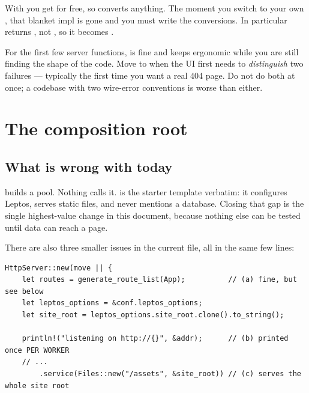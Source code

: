 \begin{pitfall}
With  you get  for free, so  converts anything. The moment you switch to your own
, that blanket impl is gone and you must write the conversions. In particular
 returns , not , so it
becomes .
\end{pitfall}

\begin{pattern}
For the first few server functions,  is fine and keeps 
ergonomic while you are still finding the shape of the code. Move to  when the UI
first needs to \emph{distinguish} two failures --- typically the first time you want a real 404
page. Do not do both at once; a codebase with two wire-error conventions is worse than either.
\end{pattern}

\chapter{The composition root}
\label{ch:composition}

\section{What is wrong with  today}

 builds a pool. Nothing calls it.  is the
starter template verbatim: it configures Leptos, serves static files, and never mentions a
database. Closing that gap is the single highest-value change in this document, because nothing
else can be tested until data can reach a page.

There are also three smaller issues in the current file, all in the same few lines:

\begin{lstlisting}[style=rs,caption={\file{src/main.rs}, lines 15--21 --- three problems in seven lines.}]
HttpServer::new(move || {
    let routes = generate_route_list(App);          // (a) fine, but see below
    let leptos_options = &conf.leptos_options;
    let site_root = leptos_options.site_root.clone().to_string();

    println!("listening on http://{}", &addr);      // (b) printed once PER WORKER
    // ...
        .service(Files::new("/assets", &site_root)) // (c) serves the whole site root
\end{lstlisting}


